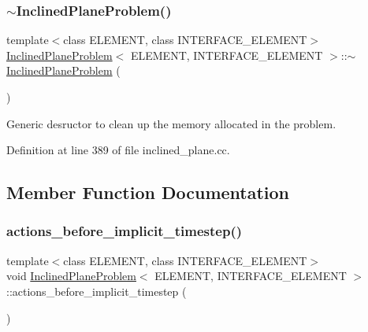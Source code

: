 \subsubsection{\texorpdfstring{$\sim$\+Inclined\+Plane\+Problem()}{~InclinedPlaneProblem()}}
{\footnotesize\ttfamily template$<$class E\+L\+E\+M\+E\+NT, class I\+N\+T\+E\+R\+F\+A\+C\+E\+\_\+\+E\+L\+E\+M\+E\+NT$>$ \\
\hyperlink{classInclinedPlaneProblem}{Inclined\+Plane\+Problem}$<$ E\+L\+E\+M\+E\+NT, I\+N\+T\+E\+R\+F\+A\+C\+E\+\_\+\+E\+L\+E\+M\+E\+NT $>$\+::$\sim$\hyperlink{classInclinedPlaneProblem}{Inclined\+Plane\+Problem} (\begin{DoxyParamCaption}{ }\end{DoxyParamCaption})\hspace{0.3cm}{\ttfamily [inline]}}



Generic desructor to clean up the memory allocated in the problem. 



Definition at line 389 of file inclined\+\_\+plane.\+cc.



\subsection{Member Function Documentation}
\mbox{\label{classInclinedPlaneProblem_af9cf7a9677e823c52f1646105dfa7937}} 
\subsubsection{\texorpdfstring{actions\+\_\+before\+\_\+implicit\+\_\+timestep()}{actions\_before\_implicit\_timestep()}}
{\footnotesize\ttfamily template$<$class E\+L\+E\+M\+E\+NT, class I\+N\+T\+E\+R\+F\+A\+C\+E\+\_\+\+E\+L\+E\+M\+E\+NT$>$ \\
void \hyperlink{classInclinedPlaneProblem}{Inclined\+Plane\+Problem}$<$ E\+L\+E\+M\+E\+NT, I\+N\+T\+E\+R\+F\+A\+C\+E\+\_\+\+E\+L\+E\+M\+E\+NT $>$\+::actions\+\_\+before\+\_\+implicit\+\_\+timestep (\begin{DoxyParamCaption}{ }\end{DoxyParamCaption})\hspace{0.3cm}{\ttfamily [inline]}}



